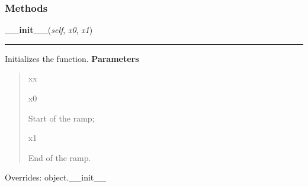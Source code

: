 
  \subsubsection{Methods}

    \vspace{0.5ex}

\hspace{.8\funcindent}\begin{boxedminipage}{\funcwidth}

    \raggedright \textbf{\_\_init\_\_}(\textit{self}, \textit{x0}, \textit{x1})

    \vspace{-1.5ex}

    \rule{\textwidth}{0.5\fboxrule}
\setlength{\parskip}{2ex}

Initializes the function.
\setlength{\parskip}{1ex}
      \textbf{Parameters}
      \vspace{-1ex}

      \begin{quote}
        \begin{Ventry}{xx}

          \item[x0]


Start of the ramp;
          \item[x1]


End of the ramp.
        \end{Ventry}

      \end{quote}

      Overrides: object.\_\_init\_\_

    \end{boxedminipage}

    \vspace{0.5ex}

